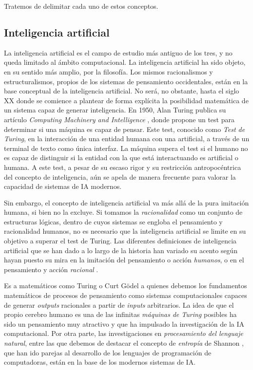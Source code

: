 Tratemos de delimitar cada uno de estos conceptos.

\subsection{Inteligencia artificial}

La inteligencia artificial es el campo de estudio más antiguo de los tres, y no queda limitado al ámbito computacional. La inteligencia artificial ha sido objeto, en su sentido más amplio, por la filosofía. Los mismos racionalismos y estructuralismos, propios de los sistemas de pensamiento occidentales, están en la base conceptual de la inteligencia artificial. No será, no obstante, hasta el siglo XX donde se comience a plantear de forma explícita la posibilidad matemática de un sistema capaz de generar inteligencia. En 1950, Alan Turing publica su artículo \textit{Computing Machinery and Intelligence} \cite{alan1950a}, donde propone un test para determinar si una máquina es capaz de pensar. Este test, conocido como \textit{Test de Turing}, en la interacción de una entidad humana con una artificial, a través de un terminal de texto como única interfaz. La máquina supera el test si el humano no es capaz de distinguir si la entidad con la que está interactuando es artificial o humana. A este test, a pesar de su escaso rigor y su restricción antropocéntrica del concepto de inteligencia, aún se apela de manera frecuente para valorar la capacidad de sistemas de IA modernos.

Sin embargo, el concepto de inteligencia artificial va más allá de la pura imitación humana, si bien no la excluye. Si tomamos la \emph{racionalidad} como un conjunto de estructuras lógicas, dentro de cuyos sistemas se engloba el pensamiento y racionalidad humanos, no es necesario que la inteligencia artificial se limite en su objetivo a superar el test de Turing. Las diferentes definiciones de inteligencia artificial que se han dado a lo largo de la historia han variado su acento según hayan puesto su mira en la imitación del pensamiento o acción \emph{humanos}, o en el pensamiento y acción \emph{racional} \cite{RussellStuartJ2021AI:A}.

Es a matemáticos como Turing o Curt Gödel a quienes debemos los fundamentos matemáticos de procesos de pensamiento como sistemas computacionales capaces de generar \textit{outputs} racionales a partir de \textit{inputs} arbitrarios. La idea de que el propio cerebro humano es una de las infinitas \emph{máquinas de Turing} posibles \cite{penroseNuevaMenteEmperador2015} ha sido un pensamiento muy atractivo y que ha impulsado la investigación de la IA computacional. Por otra parte, las investigaciones en \textit{procesamiento del lenguaje natural}, entre las que debemos de destacar el concepto de \emph{entropía} de Shannon \cite{shannon1951prediction}, que han ido parejas al desarrollo de los lenguajes de programación de computadoras, están en la base de los modernos sistemas de IA.

